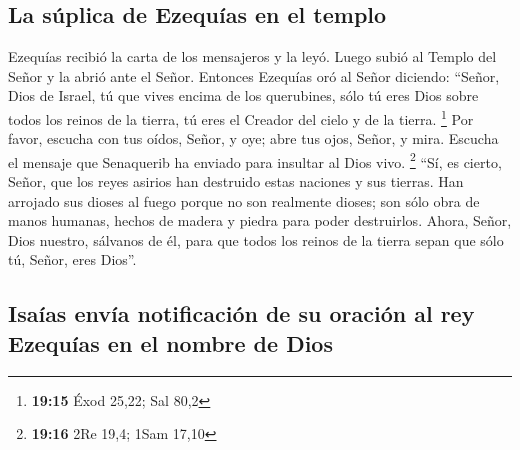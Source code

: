 \hypertarget{la-suxfaplica-de-ezequuxedas-en-el-templo}{%
\subsection{La súplica de Ezequías en el
templo}\label{la-suxfaplica-de-ezequuxedas-en-el-templo}}

 Ezequías recibió la carta de los mensajeros y la leyó.
Luego subió al Templo del Señor y la abrió ante el Señor.
 Entonces Ezequías oró al Señor diciendo: ``Señor, Dios
de Israel, tú que vives encima de los querubines, sólo tú eres Dios
sobre todos los reinos de la tierra, tú eres el Creador del cielo y de
la tierra. \footnote{\textbf{19:15} Éxod 25,22; Sal 80,2}
 Por favor, escucha con tus oídos, Señor, y oye; abre tus
ojos, Señor, y mira. Escucha el mensaje que Senaquerib ha enviado para
insultar al Dios vivo. \footnote{\textbf{19:16} 2Re 19,4; 1Sam 17,10}
 ``Sí, es cierto, Señor, que los reyes asirios han
destruido estas naciones y sus tierras.  Han arrojado sus
dioses al fuego porque no son realmente dioses; son sólo obra de manos
humanas, hechos de madera y piedra para poder destruirlos.
 Ahora, Señor, Dios nuestro, sálvanos de él, para que
todos los reinos de la tierra sepan que sólo tú, Señor, eres Dios''.

\hypertarget{isauxedas-envuxeda-notificaciuxf3n-de-su-oraciuxf3n-al-rey-ezequuxedas-en-el-nombre-de-dios}{%
\subsection{Isaías envía notificación de su oración al rey Ezequías en
el nombre de
Dios}\label{isauxedas-envuxeda-notificaciuxf3n-de-su-oraciuxf3n-al-rey-ezequuxedas-en-el-nombre-de-dios}}

